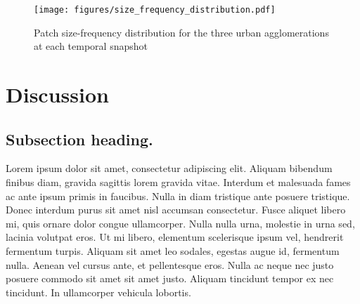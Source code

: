\documentclass[10pt,letterpaper]{article}
\begin{document}
\begin{figure}[ht]
  \begin{adjustwidth}{-.4\textwidth}{0cm}
    \centering
    \texttt{[image: figures/size\_frequency\_distribution.pdf]}
    \vspace{.5em}
    \caption[Patch size-frequency distribution]{\label{figures/size_frequency_distribution.pdf}Patch size-frequency distribution for the three urban agglomerations  at each temporal snapshot}
  \end{adjustwidth}
\end{figure}





\section*{Discussion}
\subsection*{Subsection heading.}

Lorem ipsum dolor sit amet, consectetur adipiscing elit. Aliquam bibendum finibus diam, gravida sagittis lorem gravida vitae. Interdum et malesuada fames ac ante ipsum primis in faucibus. Nulla in diam tristique ante posuere tristique. Donec interdum purus sit amet nisl accumsan consectetur. Fusce aliquet libero mi, quis ornare dolor congue ullamcorper. Nulla nulla urna, molestie in urna sed, lacinia volutpat eros. Ut mi libero, elementum scelerisque ipsum vel, hendrerit fermentum turpis. Aliquam sit amet leo sodales, egestas augue id, fermentum nulla. Aenean vel cursus ante, et pellentesque eros. Nulla ac neque nec justo posuere commodo sit amet sit amet justo. Aliquam tincidunt tempor ex nec tincidunt. In ullamcorper vehicula lobortis. 
\end{document}
